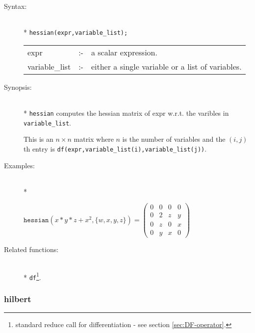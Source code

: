 \begin{description}
\item[Syntax:]\mbox{}\\*
\texttt{hessian(expr,variable\_list);}\\[2mm]
\begin{tabular}{l l l}
expr           &:-& a scalar expression. \\
variable\_list &:-& either a single variable or a list of variables.
\end{tabular}

\item[Synopsis:]\mbox{}\\*
                \texttt{hessian} computes the hessian matrix of expr w.r.t.
                the varibles in \texttt{variable\_list}. 

This is an $n\times n$ matrix where $n$ is the number of variables and the
$(i,j)$th entry is \texttt{df(expr,variable\_list(i),variable\_list(j))}.

\item[Examples:]\mbox{}\\*
\begin{flushleft}  
\begin{math}        
\texttt{hessian}(x*y*z+x^2,\{w,x,y,z\}) =
 \begin{pmatrix} 0 & 0 & 0 & 0 \\ 0 & 2 & z & y \\ 0 & z & 0 & x \\ 0 & y & x & 0
  \end{pmatrix}
\end{math}  
\end{flushleft}

\item[Related functions:]\mbox{}\\*
\texttt{df}\footnote{standard reduce call for 
differentiation - see section \protect\ref{sec:DF-operator}.}.
\end{description}


\subsubsection{hilbert}
\label{linalg:hilbert}

